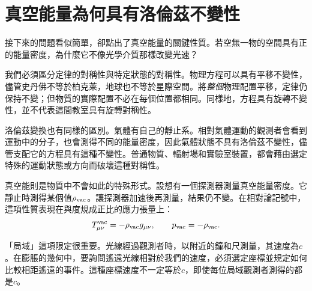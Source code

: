 \section{真空能量為何具有洛倫茲不變性}

接下來的問題看似簡單，卻點出了真空能量的關鍵性質。若空無一物的空間具有正的能量密度，為什麼它不像光學介質那樣改變光速？

\begin{classroomqa}
\end{classroomqa}

我們必須區分定律的對稱性與特定狀態的對稱性。物理方程可以具有平移不變性，儘管史丹佛不等於柏克萊，地球也不等於星際空間。將\emph{整個}物理配置平移，定律仍保持不變；但物質的實際配置不必在每個位置都相同。同樣地，方程具有旋轉不變性，並不代表這間教室具有旋轉對稱性。

洛倫茲變換也有同樣的區別。氣體有自己的靜止系。相對氣體運動的觀測者會看到運動中的分子，也會測得不同的能量密度，因此氣體狀態不具有洛倫茲不變性，儘管支配它的方程具有這種不變性。普通物質、輻射場和實驗室裝置，都會藉由選定特殊的運動狀態或方向而破壞這種對稱性。

真空能則是物質中不會如此的特殊形式。設想有一個探測器測量真空能量密度。它靜止時測得某個值\(\rho_{\rm vac}\)。讓探測器加速後再測量，結果仍不變。在相對論記號中，這項性質表現在與度規成正比的應力張量上：
\begin{equation}
T_{\mu\nu}^{\rm vac}=-\rho_{\rm vac}g_{\mu\nu},
\qquad
p_{\rm vac}=-\rho_{\rm vac}.
\label{eq:l08-vacuum-stress}
\end{equation}

「局域」這項限定很重要。光線經過觀測者時，以附近的鐘和尺測量，其速度為\(c\)。在膨脹的幾何中，要詢問遙遠光線相對於我們的速度，必須選定座標並規定如何比較相距遙遠的事件。這種座標速度不一定等於\(c\)，即使每位局域觀測者測得的都是\(c\)。

\begin{classroomqa}
\end{classroomqa}

